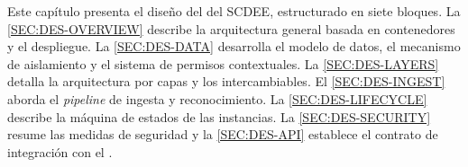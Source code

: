 Este capítulo presenta el diseño del  del SCDEE, estructurado
en siete bloques. La \cref{SEC:DES-OVERVIEW} describe la arquitectura
general basada en contenedores y el despliegue. La \cref{SEC:DES-DATA}
desarrolla el modelo de datos, el mecanismo de aislamiento
 y el sistema de permisos contextuales. La
\cref{SEC:DES-LAYERS} detalla la arquitectura por capas y los
 intercambiables. El \cref{SEC:DES-INGEST} aborda el
\textit{pipeline} de ingesta y reconocimiento. La
\cref{SEC:DES-LIFECYCLE} describe la máquina de estados de las
instancias. La \cref{SEC:DES-SECURITY} resume las medidas de seguridad y
la \cref{SEC:DES-API} establece el contrato de integración con el
.
